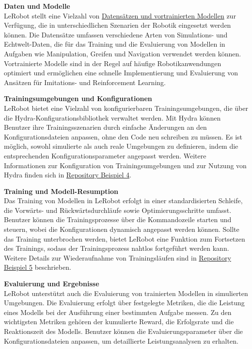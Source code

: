 \documentclass[a4paper, 12pt]{article}
\begin{document}
\textbf{Daten und Modelle}\\
LeRobot stellt eine Vielzahl von \href{https://huggingface.co/lerobot}{Datensätzen und vortrainierten Modellen} zur Verfügung, die in unterschiedlichen Szenarien der Robotik eingesetzt werden können. Die Datensätze umfassen verschiedene Arten von Simulations- und Echtwelt-Daten, die für das Training und die Evaluierung von Modellen in Aufgaben wie Manipulation, Greifen und Navigation verwendet werden können. Vortrainierte Modelle sind in der Regel auf häufige Robotikanwendungen optimiert und ermöglichen eine schnelle Implementierung und Evaluierung von Ansätzen für Imitations- und Reinforcement Learning. 

\textbf{Trainingsumgebungen und Konfigurationen}\\
LeRobot bietet eine Vielzahl von konfigurierbaren Trainingsumgebungen, die über die Hydra-Konfigurationsbibliothek verwaltet werden. Mit Hydra können Benutzer ihre Trainingsszenarien durch einfache Änderungen an den Konfigurationsdateien anpassen, ohne den Code neu schreiben zu müssen. Es ist möglich, sowohl simulierte als auch reale Umgebungen zu definieren, indem die entsprechenden Konfigurationsparameter angepasst werden. Weitere Informationen zur Konfiguration von Trainingsumgebungen und zur Nutzung von Hydra finden sich in \href{https://github.com/huggingface/lerobot/blob/main/examples/4_train_policy_with_script.md}{Repository Beispiel 4}.

\textbf{Training und Modell-Resumption}\\
Das Training von Modellen in LeRobot erfolgt in einer standardisierten Schleife, die Vorwärts- und Rückwärtsdurchläufe sowie Optimierungsschritte umfasst. Benutzer können die Trainingsprozesse über die Kommandozeile starten und steuern, wobei die Konfigurationen dynamisch angepasst werden können. Sollte das Training unterbrochen werden, bietet LeRobot eine Funktion zum Fortsetzen des Trainings, sodass der Trainingsprozess nahtlos fortgeführt werden kann. Weitere Details zur Wiederaufnahme von Trainingsläufen sind in \href{https://github.com/huggingface/lerobot/blob/main/examples/5_resume_training.md}{Repository Beispiel 5} beschrieben.

\textbf{Evaluierung und Ergebnisse}\\
LeRobot unterstützt auch die Evaluierung von trainierten Modellen in simulierten Umgebungen. Die Evaluierung erfolgt über festgelegte Metriken, die die Leistung eines Modells bei der Ausführung einer bestimmten Aufgabe messen. Zu den wichtigsten Metriken gehören der kumulierte Reward, die Erfolgsrate und die Reaktionszeit des Modells. Benutzer können die Evaluierungsparameter über die Konfigurationsdateien anpassen, um detaillierte Leistungsanalysen zu erhalten.
\end{document}
